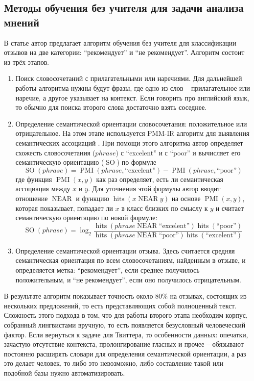 \subsection{Методы обучения без учителя для задачи анализа мнений}
В статье \cite{pang2002thumbs} автор предлагает алгоритм обучения без учителя для классификации
отзывов на две категории: ``рекомендует'' и ``не рекомендует''. Алгоритм состоит из трёх
этапов.
\begin{enumerate}
\item Поиск словосочетаний с прилагательными или наречиями. Для дальнейшей работы алгоритма нужны
  будут фразы, где одно из слов -- прилагательное или наречие, а другое указывает на контекст. Если
  говорить про английский язык, то обычно для поиска второго слова достаточно взять соседнее.
\item Определение семантической ориентации словосочетания: положительное или отрицательное. На этом
  этапе используется PMM-IR алгоритм для выявления семантических ассоциаций
  \cite{Church:1989:PWA:1075434.1075449}. При помощи этого алгоритма автор определяет схожесть словосочетания ($phrase$)
  с ``excelent'' и с ``poor'' и вычисляет его семантическую ориентацию ($\operatorname{SO}$) по формуле
\begin{equation}
  \operatorname{SO}(phrase) = \operatorname{PMI}(phrase, \textrm{``excelent''}) -
  \operatorname{PMI}(phrase, \textrm{``poor''})
\end{equation}
где функция $\operatorname{PMI}(x,y)$ как раз определяет, есть ли семантическая ассоциация между $x$ и $y$. Для уточнения этой
формулы автор вводит отношение $\operatorname{NEAR}$ и функцию $\operatorname{hits}(x
\operatorname{NEAR} y)$ на основе $\operatorname{PMI}(x,y)$, которая показывает, попадает ли
$x$ в класс близких по смыслу к $y$ и считает семантическую ориентацию  по новой формуле:
\begin{equation}
\operatorname{SO}(phrase)
= \log_2 \frac
          {\operatorname{hits}(phrase \operatorname{NEAR} \textrm{``excelent''}) \operatorname{hits}(\textrm{``poor''})}
          {\operatorname{hits}(phrase \operatorname{NEAR} \textrm{``poor''}) \operatorname{hits}(\textrm{``excelent''})}
\end{equation}
\item Определение семантической ориентации отзыва. Здесь считается средняя семантическая ориентация
  по всем словосочетаниям, найденным в отзыве, и определяется метка: ``рекомендует'', если среднее
  получилось положительным, и ``не рекомендует'', если оно получилось отрицательным.
\end{enumerate}
В результате алгоритм показывает точность около 80\% на отзывах, состоящих из нескольких
предложений, то есть представляющих собой полноценный текст. Сложность этого подхода в том, что для
работы второго этапа необходим корпус, собранный лингвистами вручную, то есть появляется безусловный
человеческий фактор. Если вернуться к задаче для Твиттера, то особенности данных: опечатки,
зачастую отсутствие контекста, пролонгирование гласных и прочее -- обязывают постоянно расширять
словари для определения семантической ориентации, а раз это делает человек, то либо это невозможно,
либо составление такой или подобной базы нужно автоматизировать.

